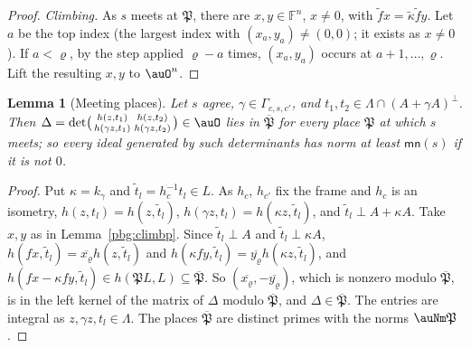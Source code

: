 \documentclass[10pt]{amsart}
\newtheorem{lemma}[theorem]{Lemma}
\theoremstyle{definition}
\theoremstyle{remark}
\providecommand{\aubar}[1]{\overline{#1}}
\begin{document}
\begin{proof}
\emph{Climbing.} As $s$ meets at $\mathfrak P$, there are $x,y\in\mathbb F^n$, $x\ne0$, with $\tilde fx=
\tilde\kappa\tilde fy$. Let $a$ be the top index (the largest index with $(x_a,y_a)\ne(0,0)$; it exists as
$x\ne0$). If $a<\varrho$, by the step applied $\varrho-a$ times, $(x_a,y_a)$ occurs at $a+1,\dots,\varrho$. Lift the resulting $x,y$ to $\auO^n$.
\end{proof}

\begin{lemma}[Meeting places]\label{pbg:meet}
Let $s$ agree, $\gamma\in\Gamma_{c,s,c'}$, and $t_1,t_2\in\Lambda\cap(A+
\gamma A)^\perp$. Then $\Delta=\det\bigl(\begin{smallmatrix}h(z,t_1)&h(z,t_2)\\h(\gamma z,t_1)&h(\gamma
z,t_2)\end{smallmatrix}\bigr)\in\auO$ lies in $\aubar{\mathfrak P}$ for every place $\mathfrak P$ at
which $s$ meets; so every ideal generated by such determinants has norm at least $\mathsf{mn}(s)$ if it
is not $0$.
\end{lemma}
\begin{proof}
Put $\kappa=k_\gamma$ and $\tilde t_l=h_c^{-1}t_l\in L$. As $h_c$, $h_{c'}$ fix the frame and $h_c$ is an
isometry, $h(z,t_l)=h(z,\tilde t_l)$, $h(\gamma z,t_l)=h(\kappa z,\tilde t_l)$, and $\tilde t_l\perp A+\kappa A$. Take
$x,y$ as in Lemma~\ref{pbg:climbp}. Since $\tilde t_l\perp A$ and $\tilde t_l\perp \kappa A$, $h(fx,\tilde t_l)=
\aubar{x_\varrho}h(z,\tilde t_l)$ and $h(\kappa fy,\tilde t_l)=\aubar{y_\varrho}h(\kappa z,\tilde t_l)$, and $h(fx-\kappa fy,
\tilde t_l)\in h(\mathfrak PL,L)\subseteq\aubar{\mathfrak P}$. So $(\aubar{x_\varrho},-\aubar{y_\varrho})$, which
is nonzero modulo $\aubar{\mathfrak P}$, is in the left kernel of the matrix of $\Delta$ modulo
$\aubar{\mathfrak P}$, and $\Delta\in\aubar{\mathfrak P}$. The entries are integral as $z,\gamma z,t_l
\in\Lambda$. The places $\aubar{\mathfrak P}$ are distinct primes with the norms $\auNm\mathfrak P$.
\end{proof}
\end{document}

